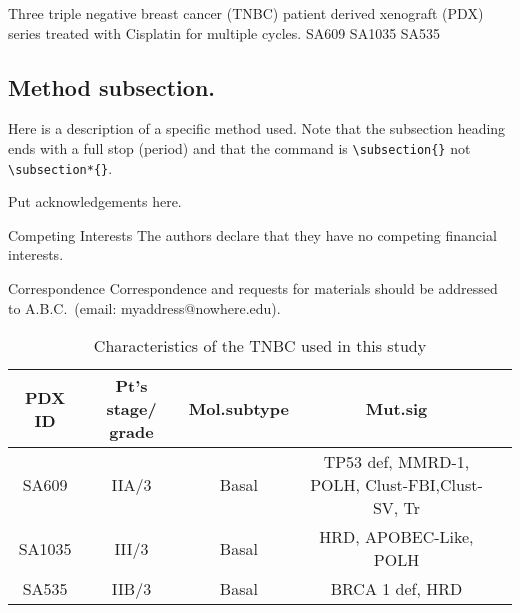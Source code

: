 \documentclass{nature}
\begin{document}
\begin{methods}
Three triple negative breast cancer (TNBC) patient derived xenograft (PDX) series treated with Cisplatin for multiple cycles.
SA609 
SA1035
SA535

\subsection{Method subsection.}

Here is a description of a specific method used.  Note that the
subsection heading ends with a full stop (period) and that the
command is \verb|\subsection{}| not \verb|\subsection*{}|.

\end{methods}








\begin{addendum}
 \item Put acknowledgements here.
 \item[Competing Interests] The authors declare that they have no
competing financial interests.
 \item[Correspondence] Correspondence and requests for materials
should be addressed to A.B.C.~(email: myaddress@nowhere.edu).
\end{addendum}


\begin{table}
\centering
\caption{Characteristics of the TNBC used in this study}
\medskip
\begin{tabular}{ccccc}
\hline
PDX ID & Pt's stage/ grade & Mol.subtype & Mut.sig\\
\hline
SA609 & IIA/3 & Basal & TP53 def, MMRD-1, POLH, Clust-FBI,Clust-SV, Tr \\
SA1035 & III/3 & Basal & HRD, APOBEC-Like, POLH\\
SA535 & IIB/3 & Basal & BRCA 1 def, HRD\\


\hline
\end{tabular}
\end{table}
\end{document}
